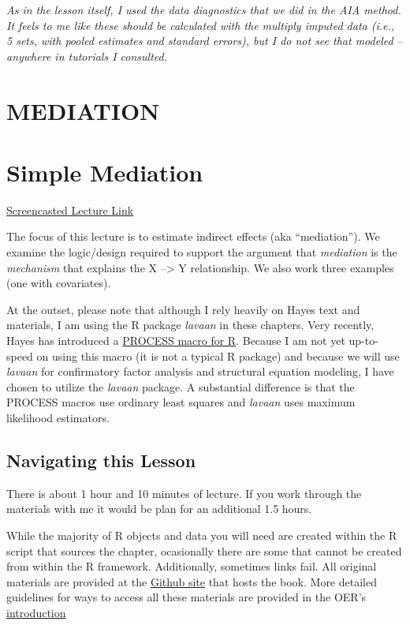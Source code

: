 \documentclass[
  11pt,
]{book}
\begin{document}
\emph{As in the lesson itself, I used the data diagnostics that we did in the AIA method. It feels to me like these should be calculated with the multiply imputed data (i.e., 5 sets, with pooled estimates and standard errors), but I do not see that modeled -- anywhere in tutorials I consulted.}

\hypertarget{MED}{%
\chapter*{MEDIATION}\label{MED}}


\hypertarget{SimpleMed}{%
\chapter{Simple Mediation}\label{SimpleMed}}

\href{https://spu.hosted.panopto.com/Panopto/Pages/Viewer.aspx?pid=7ffb03e6-b34b-4e0b-8f10-ad080180b069}{Screencasted Lecture Link}

The focus of this lecture is to estimate indirect effects (aka ``mediation''). We examine the logic/design required to support the argument that \emph{mediation} is the \emph{mechanism} that explains the X --\textgreater{} Y relationship. We also work three examples (one with covariates).

At the outset, please note that although I rely heavily on Hayes \citeyearpar{hayes_introduction_2018} text and materials, I am using the R package \emph{lavaan} in these chapters. Very recently, Hayes has introduced a \href{https://www.processmacro.org/index.html}{PROCESS macro for R}. Because I am not yet up-to-speed on using this macro (it is not a typical R package) and because we will use \emph{lavaan} for confirmatory factor analysis and structural equation modeling, I have chosen to utilize the \emph{lavaan} package. A substantial difference is that the PROCESS macros use ordinary least squares and \emph{lavaan} uses maximum likelihood estimators.

\hypertarget{navigating-this-lesson-4}{%
\section{Navigating this Lesson}\label{navigating-this-lesson-4}}

There is about 1 hour and 10 minutes of lecture. If you work through the materials with me it would be plan for an additional 1.5 hours.

While the majority of R objects and data you will need are created within the R script that sources the chapter, ocasionally there are some that cannot be created from within the R framework. Additionally, sometimes links fail. All original materials are provided at the \href{https://github.com/lhbikos/ReC_MultivModel}{Github site} that hosts the book. More detailed guidelines for ways to access all these materials are provided in the OER's \protect\hyperlink{ReCintro}{introduction}
\end{document}
